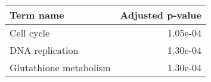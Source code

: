 \begin{tabular}{lr}
\toprule
             Term name &  Adjusted p-value \\
\midrule
            Cell cycle &          1.05e-04 \\
       DNA replication &          1.30e-04 \\
Glutathione metabolism &          1.30e-04 \\
\bottomrule
\end{tabular}
